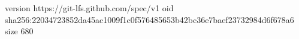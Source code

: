 version https://git-lfs.github.com/spec/v1
oid sha256:22034723852da45ac1009f1c0f576485653b42bc36e7baef23732984d6f678a6
size 680
